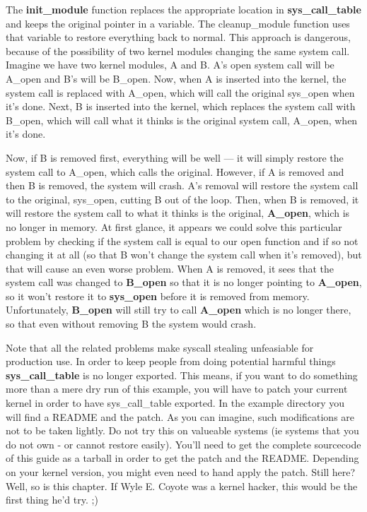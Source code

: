 \documentclass[10pt, oneside]{book}
\begin{document}
The \textbf{init\_module} function replaces the appropriate location in \textbf{sys\_call\_table} and keeps the original pointer in a variable. The cleanup\_module function uses that variable to restore everything back to normal. This approach is dangerous, because of the possibility of two kernel modules changing the same system call. Imagine we have two kernel modules, A and B. A's open system call will be A\_open and B's will be B\_open. Now, when A is inserted into the kernel, the system call is replaced with A\_open, which will call the original sys\_open when it's done. Next, B is inserted into the kernel, which replaces the system call with B\_open, which will call what it thinks is the original system call, A\_open, when it's done.

Now, if B is removed first, everything will be well --- it will simply restore the system call to A\_open, which calls the original. However, if A is removed and then B is removed, the system will crash. A's removal will restore the system call to the original, sys\_open, cutting B out of the loop. Then, when B is removed, it will restore the system call to what it thinks is the original, \textbf{A\_open}, which is no longer in memory. At first glance, it appears we could solve this particular problem by checking if the system call is equal to our open function and if so not changing it at all (so that B won't change the system call when it's removed), but that will cause an even worse problem. When A is removed, it sees that the system call was changed to \textbf{B\_open} so that it is no longer pointing to \textbf{A\_open}, so it won't restore it to \textbf{sys\_open} before it is removed from memory. Unfortunately, \textbf{B\_open} will still try to call \textbf{A\_open} which is no longer there, so that even without removing B the system would crash.

Note that all the related problems make syscall stealing unfeasiable for production use. In order to keep people from doing potential harmful things \textbf{sys\_call\_table} is no longer exported. This means, if you want to do something more than a mere dry run of this example, you will have to patch your current kernel in order to have sys\_call\_table exported. In the example directory you will find a README and the patch. As you can imagine, such modifications are not to be taken lightly. Do not try this on valueable systems (ie systems that you do not own - or cannot restore easily). You'll need to get the complete sourcecode of this guide as a tarball in order to get the patch and the README. Depending on your kernel version, you might even need to hand apply the patch. Still here? Well, so is this chapter. If Wyle E. Coyote was a kernel hacker, this would be the first thing he'd try. ;)
\end{document}
